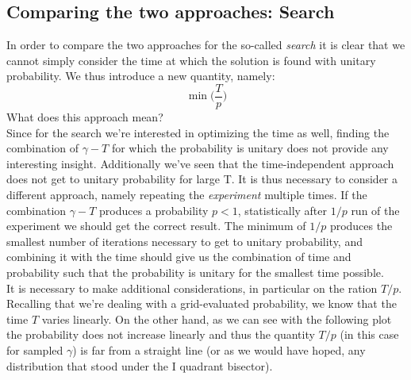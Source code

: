 \subsection{Comparing the two approaches: Search}
In order to compare the two approaches for the so-called \textit{search} it is clear that we cannot simply consider the time at which the solution is found with unitary probability. We thus introduce a new quantity, namely:
  \begin{equation}
    \min\Big(\frac{T}{p}\Big)
  \end{equation}
What does this approach mean? \\
Since for the search we're interested in optimizing the time as well, finding the combination of $\gamma-T$ for which the probability is unitary does not provide any interesting insight. Additionally we've seen that the time-independent approach does not get to unitary probability for large T. It is thus necessary to consider a different approach, namely repeating the \textit{experiment} multiple times. If the combination $\gamma-T$ produces a probability $p<1$, statistically after $1/p$ run of the experiment we should get the correct result. The minimum of $1/p$ produces the smallest number of iterations necessary to get to unitary probability, and combining it with the time should give us the combination of time and probability such that the probability is unitary for the smallest time possible.\\


It is necessary to make additional considerations, in particular on the ration $T/p$. Recalling that we're dealing with a grid-evaluated probability, we know that the time $T$ varies linearly. On the other hand, as we can see with the following plot the probability does not increase linearly and thus the quantity $T/p$ (in this case for sampled $\gamma$) is far from a straight line (or as we would have hoped, any distribution that stood under the I quadrant bisector).

